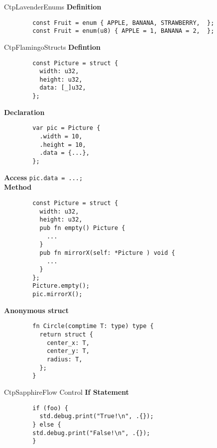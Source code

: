 \documentclass[10pt,a4paper]{article}
\begin{document}
\begin{multicols*}{3}
\begin{mycolorbox}{CtpLavender}{Enums}
	\textbf{Definition}
	\begin{verbatim}
		const Fruit = enum { APPLE, BANANA, STRAWBERRY,  };
		const Fruit = enum(u8) { APPLE = 1, BANANA = 2,  };
	\end{verbatim}
\end{mycolorbox}


\begin{mycolorbox}{CtpFlamingo}{Structs}
	\textbf{Defintion}
	\begin{verbatim}
		const Picture = struct {
		  width: u32,
		  height: u32,
		  data: [_]u32,
		};
	\end{verbatim}

		\textbf{Declaration}
	\begin{verbatim}
		var pic = Picture {
		  .width = 10,
		  .height = 10,
		  .data = {...},
		};
	\end{verbatim}

		\textbf{Access} \texttt {pic.data = {...};} \\
		\textbf{Method}
	\begin{verbatim}
		const Picture = struct {
		  width: u32,
		  height: u32,
		  pub fn empty() Picture {
		    ...
		  }
		  pub fn mirrorX(self: *Picture ) void {
		    ...
		  }
		};
		Picture.empty();
		pic.mirrorX();
	\end{verbatim}

		\textbf{Anonymous struct}
	\begin{verbatim}
		fn Circle(comptime T: type) type {
		  return struct {
		    center_x: T,
		    center_y: T,
		    radius: T,
		  };
		}
	\end{verbatim}
\end{mycolorbox}



\begin{mycolorbox}{CtpSapphire}{Flow Control}
		\textbf{If Statement}
	\begin{verbatim}
		if (foo) {
		  std.debug.print("True!\n", .{});
		} else {
		std.debug.print("False!\n", .{});
		}
	\end{verbatim}


\end{mycolorbox}
\end{multicols*}
\end{document}
